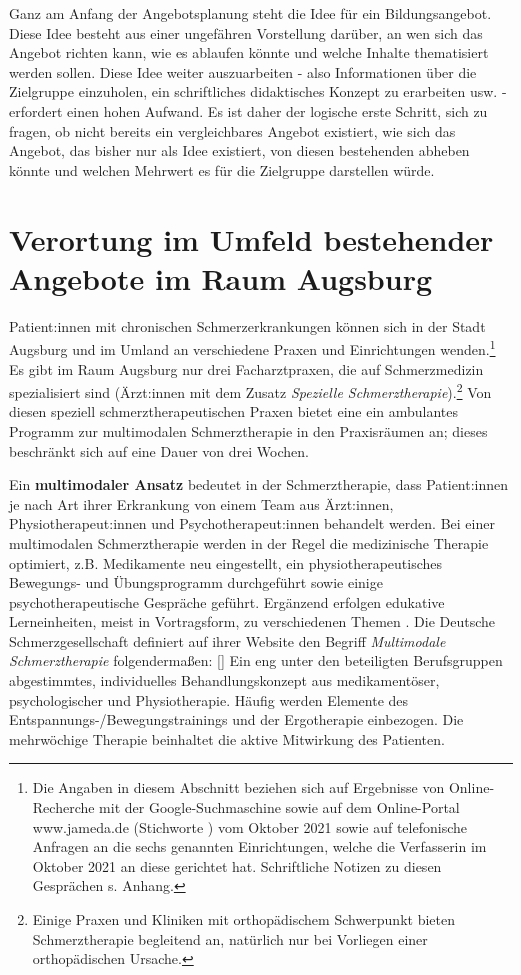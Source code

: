 \documentclass[
  twoside,
  parskip=half-,
  paper=176mm:246mm,
  BCOR=14mm,
  DIV=14,
]{scrreprt}
\makeatletter
\renewenvironment*{displayquote}
  {\begingroup\setlength{\leftmargini}{0pt}\csq@getcargs{\csq@bdquote{}{}}}
  {\csq@edquote\endgroup}
\makeatother
\begin{document}
Ganz am Anfang der Angebotsplanung steht die Idee für ein Bildungsangebot. Diese Idee besteht aus einer ungefähren Vorstellung darüber, an wen sich das Angebot richten kann, wie es ablaufen könnte und welche Inhalte thematisiert werden sollen. Diese Idee weiter auszuarbeiten - also Informationen über die Zielgruppe einzuholen, ein schriftliches didaktisches Konzept zu erarbeiten usw. - erfordert einen hohen Aufwand. Es ist daher der logische erste Schritt, sich zu fragen, ob nicht bereits ein vergleichbares Angebot existiert, wie sich das Angebot, das bisher nur als Idee existiert, von diesen bestehenden abheben könnte und welchen Mehrwert es für die Zielgruppe darstellen würde.

\section{Verortung im Umfeld bestehender Angebote im Raum Augsburg}

Patient:innen mit chronischen Schmerzerkrankungen können sich in der Stadt Augsburg und im Umland an verschiedene Praxen und Einrichtungen wenden.\footnote{Die Angaben in diesem Abschnitt beziehen sich auf Ergebnisse von Online-Recherche mit der Google-Suchmaschine sowie auf dem Online-Portal www.jameda.de (Stichworte ) vom Oktober 2021 sowie auf telefonische Anfragen an die sechs genannten Einrichtungen, welche die Verfasserin im Oktober 2021 an diese gerichtet hat. Schriftliche Notizen zu diesen Gesprächen s. Anhang.} Es gibt im Raum Augsburg nur drei Facharztpraxen, die auf Schmerzmedizin spezialisiert sind (Ärzt:innen mit dem Zusatz \textit{Spezielle Schmerztherapie}).\footnote{Einige Praxen und Kliniken mit orthopädischem Schwerpunkt bieten Schmerztherapie begleitend an, natürlich nur bei Vorliegen einer orthopädischen Ursache.} Von diesen speziell schmerztherapeutischen Praxen bietet eine ein ambulantes Programm zur multimodalen Schmerztherapie in den Praxisräumen an; dieses beschränkt sich auf eine Dauer von drei Wochen.

Ein \textbf{multimodaler Ansatz} bedeutet in der Schmerztherapie, dass Patient:innen je nach Art ihrer Erkrankung von einem Team aus Ärzt:innen, Physiotherapeut:innen und Psychotherapeut:innen behandelt werden. Bei einer multimodalen Schmerztherapie werden in der Regel die medizinische Therapie optimiert, z.B. Medikamente neu eingestellt, ein physiotherapeutisches Bewegungs- und Übungsprogramm durchgeführt sowie einige psychotherapeutische Gespräche geführt. Ergänzend erfolgen edukative Lerneinheiten, meist in Vortragsform, zu verschiedenen Themen \autocite[vgl.][99]{nobisHerausforderung}. Die Deutsche Schmerzgesellschaft definiert auf ihrer Website den Begriff \textit{Multimodale Schmerztherapie} folgendermaßen: 
\begin{displayquote}[{\cite[]{Schmerzgesellschaft}}]
  Ein eng unter den beteiligten Berufsgruppen abgestimmtes, individuelles Behandlungskonzept aus medikamentöser, psychologischer und Physiotherapie. Häufig werden Elemente des Entspannungs-/Bewegungstrainings und der Ergotherapie einbezogen. Die mehrwöchige Therapie beinhaltet die aktive Mitwirkung des Patienten.
\end{displayquote}
\end{document}

